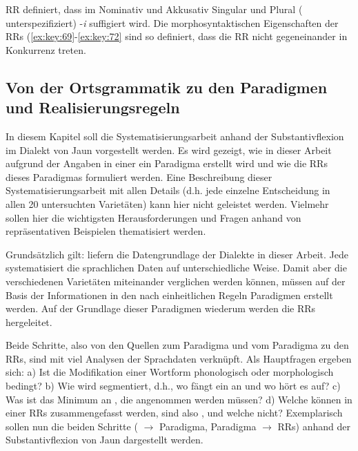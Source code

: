 RR  definiert, dass im Nominativ und Akkusativ Singular und Plural ( unterspezifiziert) -\textit{i} suffigiert wird. Die morphosyntaktischen Eigenschaften der RRs (\ref{ex:key:69}-\ref{ex:key:72} sind so definiert, dass die RR nicht gegeneinander in Konkurrenz treten.

\subsection{Von der Ortsgrammatik zu den Paradigmen und Realisierungsregeln}\label{5.1.6}

In diesem Kapitel soll die Systematisierungsarbeit anhand der Substantivflexion im Dialekt von Jaun vorgestellt werden. Es wird gezeigt, wie in dieser Arbeit aufgrund der Angaben in einer  ein Paradigma erstellt wird und wie die RRs dieses Paradigmas formuliert werden. Eine Beschreibung dieser Systematisierungsarbeit mit allen Details (d.h. jede einzelne Entscheidung in allen 20 untersuchten Varietäten) kann hier nicht geleistet werden. Vielmehr sollen hier die wichtigsten Herausforderungen und Fragen anhand von repräsentativen Beispielen thematisiert werden.

{Grundsätzlich gilt:}  liefern die Datengrundlage der Dialekte in dieser Arbeit. Jede  systematisiert die sprachlichen Daten auf unterschiedliche Weise. Damit aber die verschiedenen Varietäten miteinander verglichen werden können, müssen auf der Basis der Informationen in den  nach einheitlichen Regeln Paradigmen erstellt werden. Auf der Grundlage dieser Paradigmen wiederum werden die RRs hergeleitet.

Beide Schritte, also von den Quellen zum Paradigma und vom Paradigma zu den RRs, sind mit viel Analysen der Sprachdaten verknüpft. Als Hauptfragen ergeben sich: a) Ist die Modifikation einer Wortform phonologisch oder morphologisch bedingt? b) Wie wird segmentiert, d.h., wo fängt ein  an und wo hört es auf? c) Was ist das Minimum an , die angenommen werden müssen? d) Welche  können in einer RRs zusammengefasst werden, sind also , und welche nicht? Exemplarisch sollen nun die beiden Schritte ( $\rightarrow$ Paradigma, Paradigma $\rightarrow$ RRs) anhand der Substantivflexion von Jaun dargestellt werden.

